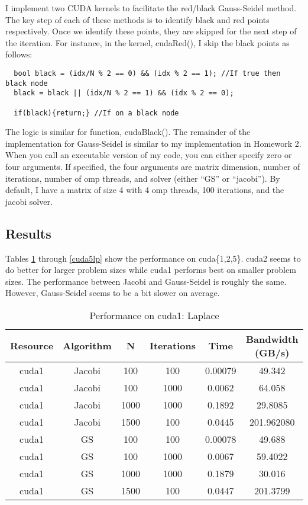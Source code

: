 \documentclass[12pt]{article}
\begin{document}
I implement two CUDA kernels to facilitate the red/black Gauss-Seidel method. The key step of each of these methods is to identify black and red points respectively. Once we identify these points, they are skipped for the next step of the iteration. For instance, in the kernel, cudaRed(), I skip the black points as follows:

\begin{verbatim}
  bool black = (idx/N % 2 == 0) && (idx % 2 == 1); //If true then black node
  black = black || (idx/N % 2 == 1) && (idx % 2 == 0);

  if(black){return;} //If on a black node
\end{verbatim}

The logic is similar for function, cudaBlack(). The remainder of the implementation for Gauss-Seidel is similar to my implementation in Homework 2.\\

When you call an executable version of my code, you can either specify zero or four arguments. If specified, the four arguments are matrix dimension, number of iterations, number of omp threads, and solver (either ``GS'' or ``jacobi''). By default, I have a matrix of size 4 with 4 omp threads, 100 iterations, and the jacobi solver.

\subsection{Results}

Tables \ref{cuda1lp} through \ref{cuda5lp} show the performance on cuda\{1,2,5\}. cuda2 seems to do better for larger problem sizes while cuda1 performs best on smaller problem sizes. The performance between Jacobi and Gauss-Seidel is roughly the same. However, Gauss-Seidel seems to be a bit slower on average.

\begin{table}[h!]
\centering
\begin{tabular}{ |c|c|c|c|c|c| }
\hline
 Resource & Algorithm & N &Iterations & Time & Bandwidth (GB/s) \\ 
  \hline
cuda1 & Jacobi & 100 & 100 & 0.00079 & 49.342\\
 \hline
cuda1 & Jacobi & 100 & 1000 & 0.0062 & 64.058\\
\hline
cuda1 & Jacobi & 1000 & 1000 & 0.1892 & 29.8085\\
\hline
cuda1 & Jacobi & 1500 & 100 & 0.0445 & 201.962080\\
\hline
cuda1 & GS & 100 & 100 & 0.00078 & 49.688\\
 \hline
cuda1 & GS & 100 & 1000 & 0.0067 & 59.4022\\
\hline
cuda1 & GS & 1000 & 1000 & 0.1879 & 30.016\\
\hline
cuda1 & GS & 1500 & 100 & 0.0447 & 201.3799\\
\hline
\end{tabular}
 \caption{Performance on cuda1: Laplace}
 \label{cuda1lp}
 \end{table}
 
\end{document}
